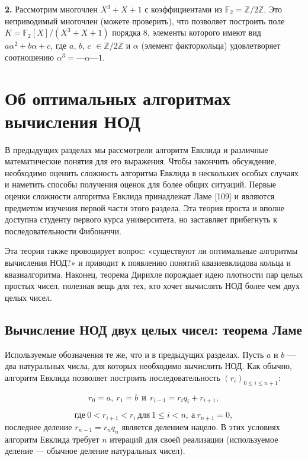 \textbf{2.}  Рассмотрим многочлен $X^3 + X + 1$ с коэффициентами из 
$\mathbb{F}_2 = \mathbb{Z}\slash 2\mathbb{Z}$. Это неприводимый многочлен (можете проверить), что  
позволяет построить поле $K = \mathbb{F}_2[X]\slash(X^3 + X + 1)$ порядка 8, элементы 
которого имеют вид $a\alpha^2 + b\alpha + c$, где $a$, $b$, $c$ $\in \mathbb{Z}/2\mathbb{Z}$ и $\alpha$ (элемент 
факторкольца) удовлетворяет соотношению $\alpha^3 = —\alpha — 1$.

\section{ Об оптимальных алгоритмах вычисления НОД}
В предыдущих разделах мы рассмотрели алгоритм Евклида и  
различные математические понятия для его выражения. Чтобы закончить 
обсуждение, необходимо оценить сложность алгоритма Евклида в  
нескольких особых случаях и наметить способы получения оценок для 
более общих ситуаций. Первые оценки сложности алгоритма Евклида 
принадлежат Ламе [109] и являются предметом изучения первой части 
этого раздела. Эта теория проста и вполне доступна студенту первого 
курса университета, но заставляет прибегнуть к последовательности 
Фибоначчи.
 
Эта теория также провоцирует вопрос: «существуют ли  
оптимальные алгоритмы вычисления НОД?» и приводит к появлению понятий 
квазиевклидова кольца и квазиалгоритма. Наконец, теорема Дирихле 
порождает идею плотности пар целых простых чисел, полезная вещь 
для тех, кто хочет вычислять НОД более чем двух целых чисел. 
 
\subsection{Вычисление НОД двух целых чисел: теорема Ламе}
Используемые обозначения те же, что и в предыдущих разделах. Пусть 
$a$ и $b$ — два натуральных числа, для которых необходимо вычислить 
НОД. Как обычно, алгоритм Евклида позволяет построить  
последовательность $(r_i)_{0 \leqslant i \leqslant n+1}$:

\begin{equation*}
r_0 = a,\: r_1 = b \:\: \text{и} \:\: r_{i-1} = r_i q_i + r_{i+1},
\end{equation*}
\newpage

\begin{equation*}
\text{где}\: 0 < r_{i+1} < r_i \: \text{для}\: 1 \leqslant i < n,\: \text{а}\: r_{n+1} = 0,
\end{equation*}
последнее деление $r_{n-1} = r_n q_n$ является делением нацело. В этих  
условиях алгоритм Евклида требует $n$ итераций для своей реализации 
(используемое деление — обычное деление натуральных чисел). 

